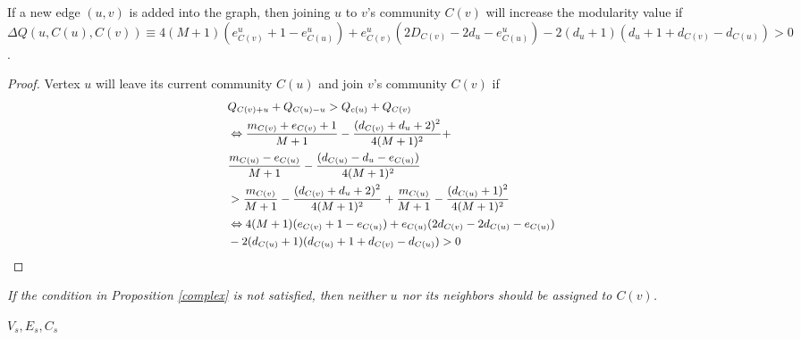 \begin{prop}\label{complex}
If a new edge $(u,v)$ is added into the graph, then joining $u$ to $v$'s  community $C(v)$ will increase the modularity value  if $\Delta Q(u,C(u),C(v)) \equiv 4(M+1)(e_{C(v)}^u+1-e_{C(u)}^u)+e_{C(v)}^u(2D_{C(v)}-2d_u-e_{C(u)}^u) - 2(d_u+1)(d_u+1+d_{C(v)}-d_{C(u)})>0$.
\end{prop}


\begin{proof}
Vertex $u$ will leave its current community $C(u)$ and join $v$'s community $C(v)$ if\\
\[\small
\begin{split}
& Q_{C(v)+u} + Q_{C(u)-u} > Q_{c(u)} + Q_{C(v)}\\
&\Leftrightarrow \frac{m_{C(v)}+e_{C(v)}+1}{M+1} - \frac{(d_{C(v)}+d_u+2)^2}{4(M+1)^2}+\\
&\frac{m_{C(u)} - e_{C(u)}}{M+1} - \frac{(d_{C(u)}-d_u-e_{C(u)})}{4(M+1)^2} \\
& > \frac{m_{C(v)}}{M+1} - \frac{(d_{C(v)}+d_u+2)^2}{4(M+1)^2} + \frac{m_{C(u)}}{M+1} - \frac{(d_{C(u)}+1)^2}{4(M+1)^2}\\
&\Leftrightarrow 4(M+1)(e_{C(v)} +1 -e_{C(u)}) + e_{C(u)}(2d_{C(v)} - 2d_{C(u)}-e_{C(u)})\\
& - 2(d_{C(u)}+1)(d_{C(u)}+1+d_{C(v)}-d_{C(u)})>0
\end{split}\]
\end{proof}

 {\em If the condition in Proposition \ref{complex} is not satisfied, then neither $u$ nor its neighbors should be assigned to $C(v)$.}


\begin{function1}[!h]
\caption{\small$BothinSample(u,v,e_t,V_s,E_s,C_s)$ } 
\Return $V_s,E_s,C_s$   
\end{function1}

